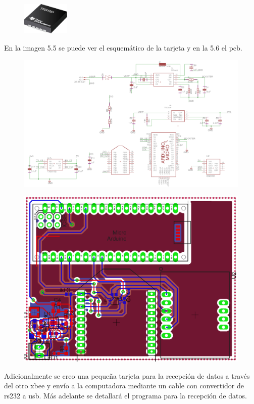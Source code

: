         \begin{figure}[htbp]
        	\centering
        	\includegraphics[width=0.2\textwidth]{./pictures/TPS61093}
        	\caption{}\label{fig: figura}
        \end{figure}
        En la imagen 5.5 se puede ver el esquemático de la tarjeta y en la 5.6 el pcb.
        \begin{figure}[htbp]
        	\centering
        	\includegraphics[width=1.\textwidth]{./pictures/schematic}
        	\caption{}\label{fig: figura}
        \end{figure}
        \begin{figure}[htbp]
        	\centering
        	\includegraphics[width=1.\textwidth]{./pictures/board}
        	\caption{}\label{fig: figura}
        \end{figure}
        Adicionalmente se creo una pequeña tarjeta para la recepción de datos a través del otro xbee y envío a la computadora mediante un cable con convertidor de rs232 a usb. Más adelante se detallará el programa para la recepción de datos.
        
